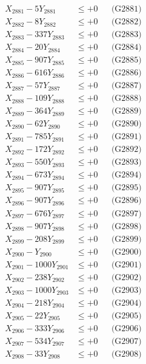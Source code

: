 \documentclass[a4paper,10pt]{article}
\begin{document}
{\begin{align}
\allowbreak
X_{2881} - 5Y_{2881} &\leq +0 && \text{(G2881)} \\
X_{2882} - 8Y_{2882} &\leq +0 && \text{(G2882)} \\
X_{2883} - 337Y_{2883} &\leq +0 && \text{(G2883)} \\
X_{2884} - 20Y_{2884} &\leq +0 && \text{(G2884)} \\
X_{2885} - 907Y_{2885} &\leq +0 && \text{(G2885)} \\
X_{2886} - 616Y_{2886} &\leq +0 && \text{(G2886)} \\
X_{2887} - 57Y_{2887} &\leq +0 && \text{(G2887)} \\
X_{2888} - 109Y_{2888} &\leq +0 && \text{(G2888)} \\
X_{2889} - 364Y_{2889} &\leq +0 && \text{(G2889)} \\
X_{2890} - 62Y_{2890} &\leq +0 && \text{(G2890)} \\
\allowbreak
X_{2891} - 785Y_{2891} &\leq +0 && \text{(G2891)} \\
X_{2892} - 172Y_{2892} &\leq +0 && \text{(G2892)} \\
X_{2893} - 550Y_{2893} &\leq +0 && \text{(G2893)} \\
X_{2894} - 673Y_{2894} &\leq +0 && \text{(G2894)} \\
X_{2895} - 907Y_{2895} &\leq +0 && \text{(G2895)} \\
X_{2896} - 907Y_{2896} &\leq +0 && \text{(G2896)} \\
X_{2897} - 676Y_{2897} &\leq +0 && \text{(G2897)} \\
X_{2898} - 907Y_{2898} &\leq +0 && \text{(G2898)} \\
X_{2899} - 208Y_{2899} &\leq +0 && \text{(G2899)} \\
X_{2900} - Y_{2900} &\leq +0 && \text{(G2900)} \\
\allowbreak
X_{2901} - 1000Y_{2901} &\leq +0 && \text{(G2901)} \\
X_{2902} - 238Y_{2902} &\leq +0 && \text{(G2902)} \\
X_{2903} - 1000Y_{2903} &\leq +0 && \text{(G2903)} \\
X_{2904} - 218Y_{2904} &\leq +0 && \text{(G2904)} \\
X_{2905} - 22Y_{2905} &\leq +0 && \text{(G2905)} \\
X_{2906} - 333Y_{2906} &\leq +0 && \text{(G2906)} \\
X_{2907} - 534Y_{2907} &\leq +0 && \text{(G2907)} \\
X_{2908} - 33Y_{2908} &\leq +0 && \text{(G2908)} \\

\end{align}}
\end{document}
